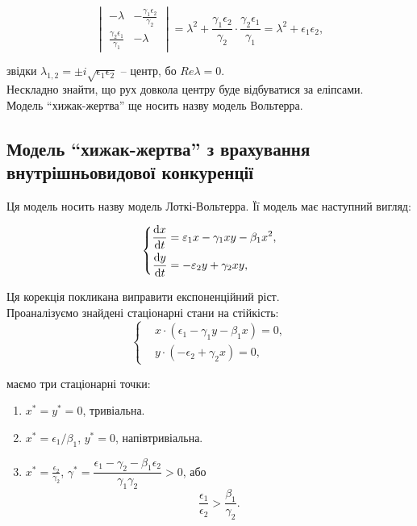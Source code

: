 \begin{equation}
    \begin{vmatrix} - \lambda & - \frac{\gamma_1 \epsilon_2}{\gamma_2} \\ \frac{\gamma_2 \epsilon_1}{\gamma_1} & - \lambda \end{vmatrix} = \lambda^2 + \frac{\gamma_1 \epsilon_2}{\gamma_2} \cdot \frac{\gamma_2 \epsilon_1}{\gamma_1} = \lambda^2 + \epsilon_1 \epsilon_2,
\end{equation}

звідки $\lambda_{1, 2} = \pm i \sqrt{\epsilon_1 \epsilon_2}$ -- центр, бо $Re \lambda = 0$. \\

Нескладно знайти, що рух довкола центру буде відбуватися за еліпсами. \\

Модель ``хижак-жертва'' ще носить назву модель Вольтерра.

\subsection{Модель ``хижак-жертва'' з врахування внутрішньовидової конкуренції}

Ця модель носить назву модель Лоткі-Вольтерра. Її модель має наступний вигляд:

\begin{equation}
    \label{eq:2.2}
    \left\{
\begin{aligned}
    \frac{\mathop{}\!\mathrm{d} x}{\mathop{}\!\mathrm{d} t} &= \varepsilon_1 x - \gamma_1 x y - \beta_1 x^2, \\
    \frac{\mathop{}\!\mathrm{d} y}{\mathop{}\!\mathrm{d} t} &= - \varepsilon_2 y + \gamma_2 x y, 
\end{aligned}
\right.
\end{equation}

Ця корекція покликана виправити експоненційний ріст. \\

Проаналізуємо знайдені стаціонарні стани на стійкість:
\begin{equation}
    \left\{
    \begin{aligned}
    & x \cdot (\epsilon_1 - \gamma_1 y - \beta_1 x) = 0, \\
    & y \cdot (- \epsilon_2 + \gamma_2 x) = 0,
\end{aligned}
\right.
\end{equation}

маємо три стаціонарні точки:
\begin{enumerate}
    \item $x^* = y^* = 0$, тривіальна.
    \item $x^* = \epsilon_1 / \beta_1$, $y^* = 0$, напівтривіальна.
    \item $x^* = \frac{\epsilon_2}{\gamma_2}$, $\gamma^* = \dfrac{\epsilon_1 - \gamma_2 - \beta_1 \epsilon_2}{\gamma_1 \gamma_2} > 0$, або 
    \begin{equation}
        \label{eq:2.3}
        \frac{\epsilon_1}{\epsilon_2} > \frac{\beta_1}{\gamma_2}.
    \end{equation} 
\end{enumerate}

